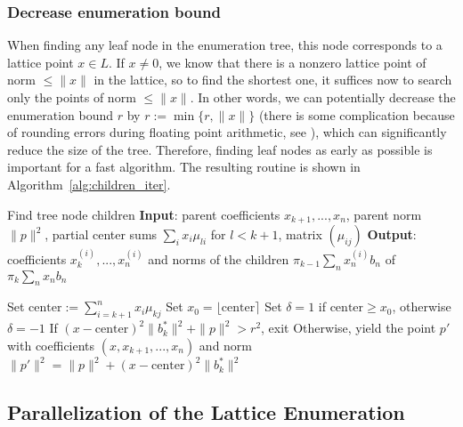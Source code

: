 \documentclass{scrartcl}
\begin{document}
    \subsubsection*{Decrease enumeration bound}

    \label{sec:enum_bound}
    When finding any leaf node in the enumeration tree, this node corresponds to a lattice point $x \in L$. 
    If $x \neq 0$, we know that there is a nonzero lattice point of norm $\leq \|x\|$ in the lattice, so to find the shortest one, it suffices now to search only the points of norm $\leq \|x\|$. 
    In other words, we can potentially decrease the enumeration bound $r$ by $r := \min \{ r, \|x\| \}$ (there is some complication because of rounding errors during floating point arithmetic, see \cite{enum_numerics}), which can significantly reduce the size of the tree. 
    Therefore, finding leaf nodes as early as possible is important for a fast algorithm.
    The resulting routine is shown in Algorithm~\ref{alg:children_iter}.

    \begin{algorithm}
        \caption{
            Find tree node children \label{alg:children_iter}
            \newline
            \textbf{Input}: parent coefficients $x_{k + 1}, ..., x_n$, parent norm $\|p\|^2$, partial center sums $\sum_i x_i \mu_{li}$ for $l < k + 1$, matrix $(\mu_{ij})$
            \newline
            \textbf{Output}: coefficients $x^{(i)}_k, ..., x^{(i)}_n$ and norms of the children $\pi_{k - 1} \sum_n x_n^{(i)}b_n$ of $\pi_k \sum_n x_n b_n$
        }
        \begin{algorithmic}
            \STATE Set $\mathrm{center} := \sum_{i = k + 1}^n x_i \mu_{kj}$
            \STATE Set $x_0 = \lfloor \mathrm{center} \rceil$
            \STATE Set $\delta = 1$ if $\mathrm{center} \geq x_0$, otherwise $\delta = -1$
                \STATE If $(x - \mathrm{center})^2 \| b^*_k \|^2 + \| p \|^2 > r^2$, exit
                \STATE Otherwise, yield the point $p'$ with coefficients $(x, x_{k + 1}, ..., x_n)$ and norm $\|p'\|^2 = \|p\|^2 + (x - \mathrm{center})^2 \|b_k^*\|^2$
            \ENDFOR
        \end{algorithmic}
    \end{algorithm}

    \subsection{Parallelization of the Lattice Enumeration}
\end{document}
